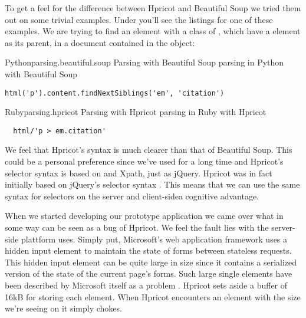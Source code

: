 To get a feel for the difference between Hpricot and Beautiful Soup we tried
them out on some trivial examples. Under you'll see the listings for one
of these examples. We are trying to find an  element with a class
of , which have a  element as its parent,
in a  document contained in the  object:

\begin{scode}{Python}{parsing.beautiful.soup}{%
  Parsing with Beautiful Soup}{%
   parsing in Python with Beautiful Soup}
\begin{lstlisting}
html('p').content.findNextSiblings('em', 'citation')
\end{lstlisting}
\end{scode}

\begin{scode}{Ruby}{parsing.hpricot}{%
  Parsing with Hpricot}{%
   parsing in Ruby with Hpricot}
\begin{lstlisting}
  html/'p > em.citation'
\end{lstlisting}
\end{scode}

We feel that Hpricot's syntax is much clearer than that of Beautiful Soup.
This could be a personal preference since we've used  for a long
time and Hpricot's selector syntax is based on  and Xpath, just as
jQuery. Hpricot was in fact initially based on jQuery's selector syntax
\citep{why06}. This means that we can use the same syntax for selectors on the
server and client-side\emph{}a cognitive advantage.

When we started developing our prototype application we came over what in
some way can be seen as a bug of Hpricot. We feel the fault lies
with the server-side plattform \urort{} uses. Simply put, Microsoft's
 web application framework uses a hidden 
input element to maintain the state of  forms between
stateless  requests. This hidden input element can be quite large%
in size since it contains a serialized version of the state of the current
page's  forms. Such large single  elements have been
described by Microsoft itself as a problem \citep{mitchell04}.
Hpricot sets aside a buffer of 16kB for storing each  element.
When Hpricot encounters an element with the size we're seeing on \urort{}
it simply chokes.

